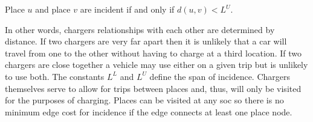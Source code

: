 \begin{corollary}
	Place $u$ and place $v$ are incident if and only if $d(u, v) < L^U$.
\end{corollary}

In other words, chargers relationships with each other are determined by distance. If two chargers are very far apart then it is unlikely that a car will travel from one to the other without having to charge at a third location. If two chargers are close together a vehicle may use either on a given trip but is unlikely to use both. The constants $L^L$ and $L^U$ define the span of incidence. Chargers themselves serve to allow for trips between places and, thus, will only be visited for the purposes of charging. Places can be visited at any \gls{soc} so there is no minimum edge cost for incidence if the edge connects at least one place node.
	